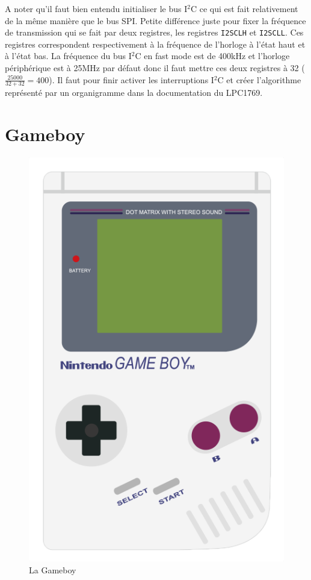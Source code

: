\documentclass[a4paper]{article}
\begin{document}
A noter qu'il faut bien entendu initialiser le bus I$^2$C ce qui est fait relativement de la même
manière que le bus SPI. Petite différence juste pour fixer la fréquence de transmission
qui se fait par deux registres, les registres \texttt{I2SCLH} et \texttt{I2SCLL}.
Ces registres correspondent respectivement à la fréquence de l'horloge à l'état haut et à l'état
bas. La fréquence du bus I$^2$C en fast mode est de 400kHz et l'horloge périphérique
est à 25MHz par défaut donc il faut mettre ces deux registres à 32 ($\frac{25000}{32+32}=400$).
Il faut pour finir activer les interruptions I$^2$C et créer l'algorithme représenté
par un organigramme dans la documentation du LPC1769.

\newpage


\section{Gameboy}

\begin{figure}[!h]
  \centering
  \includegraphics[scale=0.5]{images/gameboy.png}
  \caption{La Gameboy}
\end{figure}
\end{document}
